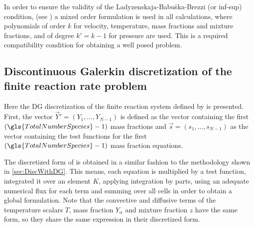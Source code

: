 In order to ensure the validity  of the  Ladyzenskaja-Babu\u{s}ka-Brezzi (or inf-sup) condition, (see \textcite{babuskaFiniteElementMethod1973})  a mixed order formulation is used in all calculations, where polynomials of order $k$ for velocity, temperature, mass fractions and mixture fractions, and of degree $k' = k-1$ for pressure are used. This is a required compatibility condition for obtaining a well posed problem. 
\subsection{Discontinuous Galerkin discretization of the finite reaction rate problem}
Here the DG discretization of the finite reaction system defined by  is presented. 
First, the vector $\vec{Y}' = \left(Y_1,\dots,Y_{N-1}\right)$ is defined as the vector containing the first $(\gls{TotalNumberSpecies}-1)$ mass fractions and $\vec{s} = \left(s_1, \dots, s_{N-1} \right)$ as the vector containing the test functions for the first $(\gls{TotalNumberSpecies}-1)$  mass fraction equations. 

The discretized form of  is obtained in a similar fashion to the methodology shown in \cref{sec:DiscWithDG}. This means, each equation is multiplied by a test function, integrated it over an element $K$, applying integration by parts, using an adequate numerical flux for each term and summing over all cells in order to obtain a global formulation. Note that the convective and diffusive terms of the temperature scalars $T$, mass fraction $Y_\alpha$ and mixture fraction $z$ have the same form, so they share the same expression in their discretized form.

